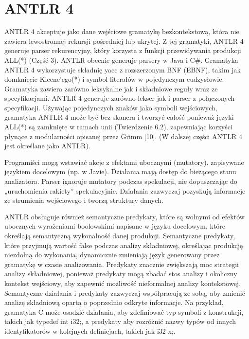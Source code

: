 ﻿\section{ANTLR 4}
ANTLR 4 akceptuje jako dane wejściowe gramatykę bezkontekstową, która nie
zawiera lewostronnej rekursji pośredniej lub ukrytej. \footnotemark[2]
Z tej gramatyki, ANTLR 4 generuje parser rekurencyjny, który korzysta z funkcji
przewidywania produkcji ALL(*) (Część 3). ANTLR obecnie generuje parsery w Java
i C{\#}.
Gramatyka ANTLR 4 wykorzystuje składnię yacc z rozszerzonym BNF (EBNF),
takim jak domknięcie Kleene'ego(*) i symbol literałów w pojedynczym cudzysłowie.
Gramatyka zawiera zarówno leksykalne jak i składniowe reguły wraz ze specyfikacjami.
ANTLR 4 generuje zarówno lekser jak i parser z połączonych specyfikacji.
Używając pojedynczych znaków jako symboli wejściowych, gramatyka ANTLR 4
może być bez skanera i tworzyć całość ponieważ języki ALL(*) są zamknięte
w ramach unii (Twierdzenie 6.2), zapewniając korzyści płynące z modularności
opisanej przez Grimm [10]. (W dalszej części ANTLR 4 jest określane jako ANTLR).
\par
Programiści mogą wstawiać akcje z efektami ubocznymi (mutatory),
zapisywane językiem docelowym (np. w Javie). Działania mają dostęp do bieżącego
stanu analizatora. Parser ignoruje mutatory podczas spekulacji,
nie dopuszczając do „uruchomienia rakiety” spekulacyjnie.
Działania zazwyczaj pozyskują informacje ze strumienia wejściowego
i tworzą struktury danych.
\par
ANTLR obsługuje również semantyczne predykaty, które są wolnymi
od efektów ubocznych wyrażeniami boolowskimi napisane w języku docelowym,
które określają semantyczną wykonalność danej produkcji.
Semantyczne predykaty, które przyjmują wartość false podczas analizy składniowej,
określając produkcję niezdolną do wykonania, dynamicznie zmieniają
język generowany przez gramatykę w czasie analizowania.\footnotemark[3]
Predykaty znacznie zwiększają moc strategii analizy składniowej, ponieważ
predykaty mogą zbadać stos analizy i okoliczny kontekst wejściowy,
aby zapewnić możliwość nieformalnej analizy kontekstowej.
Semantyczne działania i predykaty zazwyczaj współpracują ze sobą, aby
zmienić analizę składniową opartą o poprzednio odkryte informacje.
Na przykład, gramatyka C może osadzić działania, aby zdefiniować typ symboli
z konstrukcji, takich jak typedef int i32;, a predykaty aby rozróżnić nazwy
typów od innych identyfikatorów w kolejnych definicjach, takich jak i32 x;.
